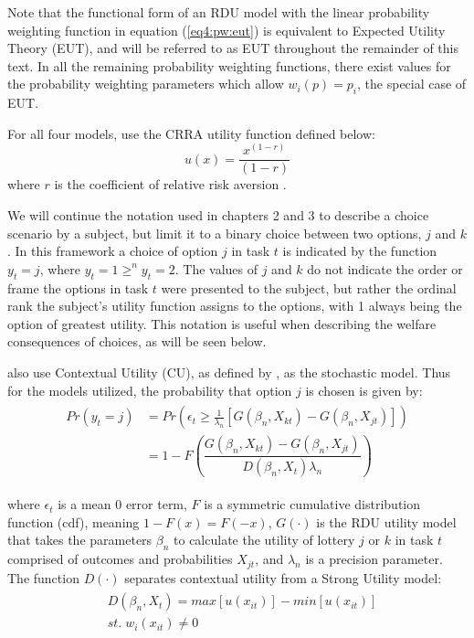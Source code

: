 \documentclass[11pt,a4paper]{report}
\newcommand\Prob{\ensuremath{\mathit{Pr}}}  %
\begin{document}
Note that the functional form of an RDU model with the linear probability weighting function in equation (\ref{eq4:pw:eut}) is equivalent to Expected Utility Theory (EUT), and will be referred to as EUT throughout the remainder of this text.
In all the remaining probability weighting functions, there exist values for the probability weighting parameters which allow $w_i(p) = p_i$, the special case of EUT.

For all four models, \textcite{Harrison2016} use the CRRA utility function defined below:
\begin{equation}
	\label{eq4:CRRA}
	u(x) = \frac{x^{(1-r)}}{(1-r)}
\end{equation}
\noindent where $r$ is the coefficient of relative risk aversion \parencite{Pratt1964}.

We will continue the notation used in chapters 2 and 3 to describe a choice scenario by a subject, but limit it to a binary choice between two options, $j$ and $k$.
In this framework a choice of option $j$ in task $t$ is indicated by the function $y_t = j$, where $y_t = 1 \geq^n y_t = 2$.
The values of $j$ and $k$ do not indicate the order or frame the options in task $t$ were presented to the subject, but rather the ordinal rank the subject's utility function assigns to the options, with 1 always being the option of greatest utility.
This notation is useful when describing the welfare consequences of choices, as will be seen below.

\textcite{Harrison2016} also use Contextual Utility (CU), as defined by \textcite{Wilcox2008}, as the stochastic model.
Thus for the models utilized, the probability that option $j$ is chosen is given by:
\begin{align}
	\label{eq4:RE.2}
	\begin{split}
		{\Prob}(y_t = j) &= {\Prob}\left(  \epsilon_t \geq \frac{1}{\lambda_n} \left[ G(\beta_n,X_{kt}) - G(\beta_n,X_{jt}) \right] \right)\\
		&= 1 - F\left( \dfrac{G(\beta_n,X_{kt}) - G(\beta_n,X_{jt})}{D(\beta_n,X_t)\lambda_n }  \right)
	\end{split}
\end{align}

\noindent where $\epsilon_t$ is a mean 0 error term, $F$ is a symmetric cumulative distribution function (cdf), meaning $1 - F(x)  = F(-x)$, $G(\cdot)$ is the RDU utility model that takes the parameters $\beta_n$ to calculate the utility of lottery $j$ or $k$ in task $t$ comprised of outcomes and probabilities $X_{jt}$, and $\lambda_n$ is a precision parameter.
The function $D(\cdot)$ separates contextual utility from a Strong Utility model:
\begin{align}
	\label{eq4:W.cu}
	\begin{split}
		&D(\beta_n,X_t) = \mathit{max}[u(x_{it})] - \mathit{min}[u(x_{it})]\\
		&\mathit{st.}\; w_i(x_{it}) \neq 0
	\end{split}
\end{align}
\end{document}
